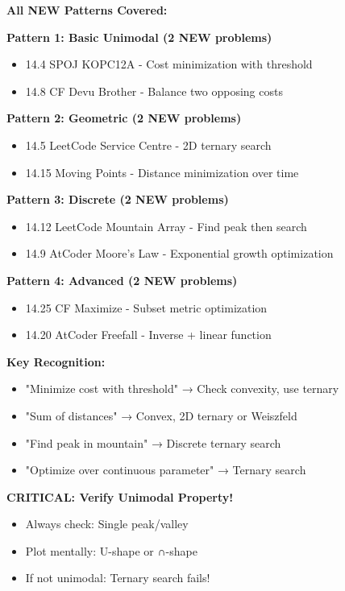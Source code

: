 \documentclass[11pt,a4paper,oneside]{book}
\begin{document}
\begin{tcolorbox}[
    enhanced,breakable,
    colback=primaryblue!10,
    colframe=primaryblue,
    boxrule=2pt,
    arc=4mm,
    title=\textbf{Ternary Search: Complete Mastery}
]
\textbf{All NEW Patterns Covered:}

\textbf{Pattern 1: Basic Unimodal (2 NEW problems)}
\begin{itemize}
\item 14.4 SPOJ KOPC12A - Cost minimization with threshold
\item 14.8 CF Devu Brother - Balance two opposing costs
\end{itemize}

\textbf{Pattern 2: Geometric (2 NEW problems)}
\begin{itemize}
\item 14.5 LeetCode Service Centre - 2D ternary search
\item 14.15 Moving Points - Distance minimization over time
\end{itemize}

\textbf{Pattern 3: Discrete (2 NEW problems)}
\begin{itemize}
\item 14.12 LeetCode Mountain Array - Find peak then search
\item 14.9 AtCoder Moore's Law - Exponential growth optimization
\end{itemize}

\textbf{Pattern 4: Advanced (2 NEW problems)}
\begin{itemize}
\item 14.25 CF Maximize - Subset metric optimization
\item 14.20 AtCoder Freefall - Inverse + linear function
\end{itemize}

\textbf{Key Recognition:}
\begin{itemize}
\item "Minimize cost with threshold" → Check convexity, use ternary
\item "Sum of distances" → Convex, 2D ternary or Weiszfeld
\item "Find peak in mountain" → Discrete ternary search
\item "Optimize over continuous parameter" → Ternary search
\end{itemize}

\textbf{CRITICAL: Verify Unimodal Property!}
\begin{itemize}
\item Always check: Single peak/valley
\item Plot mentally: U-shape or ∩-shape
\item If not unimodal: Ternary search fails!
\end{itemize}


\end{tcolorbox}
\end{document}
